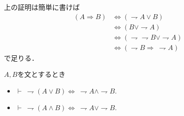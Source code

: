	上の証明は簡単に書けば
	\begin{align}
		(A \Longrightarrow B) &\Longleftrightarrow (\rightharpoondown A \vee B) \\
		&\Longleftrightarrow (B \vee \rightharpoondown A) \\
		&\Longleftrightarrow (\rightharpoondown \rightharpoondown B \vee \rightharpoondown A) \\
		&\Longleftrightarrow (\rightharpoondown B \Longrightarrow\ \rightharpoondown A)
	\end{align}
	で足りる．
	
	\begin{screen}
		\begin{logicalthm}[De Morganの法則]
			$A,B$を文とするとき
			\begin{itemize}
				\item $\vdash\ \rightharpoondown (A \vee B) \Longleftrightarrow\ \rightharpoondown A \wedge \rightharpoondown B$.
			
				\item $\vdash\ \rightharpoondown (A \wedge B) \Longleftrightarrow\ \rightharpoondown A \vee \rightharpoondown B$.
			\end{itemize}
		\end{logicalthm}
	\end{screen}
	

